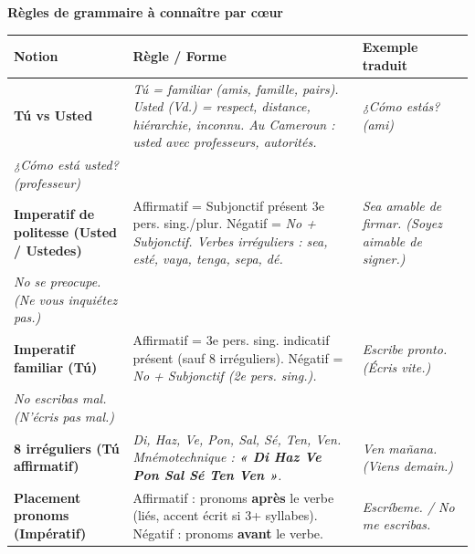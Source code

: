 \documentclass[11pt]{article}
\newcommand{\esp}[1]{\ifmmode\text{\textit{#1}}\else\begingroup\selectlanguage{spanish}\itshape #1\endgroup\fi}
\begin{document}
\begin{bilan}
\textbf{Règles de grammaire à connaître par cœur}
\begin{center}
\begin{tabularx}{\linewidth}{|X|X|X|}
\hline
\rowcolor{popgreenL}
\textbf{Notion} & \textbf{Règle / Forme} & \textbf{Exemple traduit} \\
\hline
\textbf{Tú vs Usted} & \esp{Tú} = familiar (amis, famille, pairs). \esp{Usted} (Vd.) = respect, distance, hiérarchie, inconnu. Au Cameroun : \esp{usted} avec professeurs, autorités. & \esp{¿Cómo estás?} (ami) \\ \esp{¿Cómo está usted?} (professeur) \\
\hline
\textbf{Imperatif de politesse (Usted / Ustedes)} & Affirmatif = Subjonctif présent 3e pers. sing./plur. Négatif = \esp{No} + Subjonctif. Verbes irréguliers : \esp{sea, esté, vaya, tenga, sepa, dé}. & \esp{Sea amable de firmar.} (Soyez aimable de signer.) \\ \esp{No se preocupe.} (Ne vous inquiétez pas.) \\
\hline
\textbf{Imperatif familiar (Tú)} & Affirmatif = 3e pers. sing. indicatif présent (sauf 8 irréguliers). Négatif = \esp{No} + Subjonctif (2e pers. sing.). & \esp{Escribe pronto.} (Écris vite.) \\ \esp{No escribas mal.} (N'écris pas mal.) \\
\hline
\textbf{8 irréguliers (Tú affirmatif)} & \esp{Di, Haz, Ve, Pon, Sal, Sé, Ten, Ven}. Mnémotechnique : \textbf{« Di Haz Ve Pon Sal Sé Ten Ven »}. & \esp{Ven mañana.} (Viens demain.) \\
\hline
\textbf{Placement pronoms (Impératif)} & Affirmatif : pronoms \textbf{après} le verbe (liés, accent écrit si 3+ syllabes). Négatif : pronoms \textbf{avant} le verbe. & \esp{Escríbeme.} / \esp{No me escribas.} \\
\hline
\end{tabularx}
\end{center}


\end{bilan}
\end{document}
